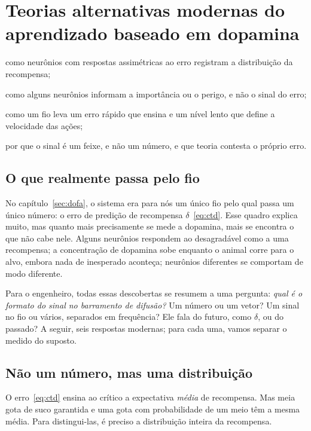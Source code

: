 \chapter{Teorias alternativas modernas do aprendizado baseado em dopamina}
\label{sec:dofaalt}
\begin{chaptergoals}
\item como neurônios  com respostas assimétricas ao erro registram a distribuição da recompensa;
\item como alguns neurônios  informam a importância ou o perigo, e não o sinal do erro;
\item como um fio leva um erro rápido que ensina e um nível lento que define a velocidade das ações;
\item por que o sinal  é um feixe, e não um número, e que teoria contesta o próprio erro.
\end{chaptergoals}

\section{O que realmente passa pelo fio}

No capítulo~\ref{sec:dofa}, o sistema  era para nós um único fio pelo qual passa um único número: o erro de predição de recompensa $\delta$~\eqref{eq:ctd}. Esse quadro explica muito, mas quanto mais precisamente se mede a dopamina, mais se encontra o que não cabe nele. Alguns neurônios respondem ao desagradável como a uma recompensa; a concentração de dopamina sobe enquanto o animal corre para o alvo, embora nada de inesperado aconteça; neurônios  diferentes se comportam de modo diferente.

Para o engenheiro, todas essas descobertas se resumem a uma pergunta: \emph{qual é o formato do sinal no barramento de difusão?} Um número ou um vetor? Um sinal no fio ou vários, separados em frequência? Ele fala do futuro, como $\delta$, ou do passado? A seguir, seis respostas modernas; para cada uma, vamos separar o medido do suposto.

\section{Não um número, mas uma distribuição}

O erro~\eqref{eq:ctd} ensina ao crítico a expectativa \emph{média} de recompensa. Mas meia gota de suco garantida e uma gota com probabilidade de um meio têm a mesma média. Para distingui-las, é preciso a distribuição inteira da recompensa.

